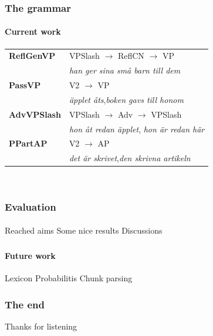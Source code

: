 \documentclass[10pt]{beamer}
\renewcommand{\baselinestretch}{1.5}
\begin{document}
\begin{frame}
\frametitle{The grammar}
\framesubtitle{Current work} 
\begin{tabular}{ll}
\alert{\textbf{ReflGenVP}} & \alert{VPSlash $\rightarrow$ ReflCN $\rightarrow$ VP} \\
& \alert{\emph{han ger sina små barn till dem}} \\

\alert{\textbf{PassVP}}
  & \alert{V2 $\rightarrow$ VP} \\ %
& \alert{\emph{äpplet åts},}\alert{\emph{boken gavs till honom}} \\ 

\alert{\textbf{AdvVPSlash}} & \alert{VPSlash $\rightarrow$ Adv $\rightarrow$ VPSlash} \\
& \alert{\emph{hon åt redan äpplet}, \emph{hon är redan här}}\\

\textbf{PPartAP} & V2 $\rightarrow$ AP \\
& \emph{det är skrivet},\emph{den skrivna artikeln}
\end{tabular}\\
\pause
\end{frame}

\begin{frame}
 \renewcommand{\baselinestretch}{1.0}
\frametitle{Evaluation}
\framesubtitle{} 
Reached aims
Some nice results
Discussions
\end{frame}



\begin{frame}
 \renewcommand{\baselinestretch}{1.0}
\frametitle{}
\framesubtitle{Future work} 
Lexicon
Probabilitis
Chunk parsing
\end{frame}

\begin{frame}
    \frametitle{The end}
\large\begin{center}Thanks for listening\end{center}
\end{frame}
\end{document}
